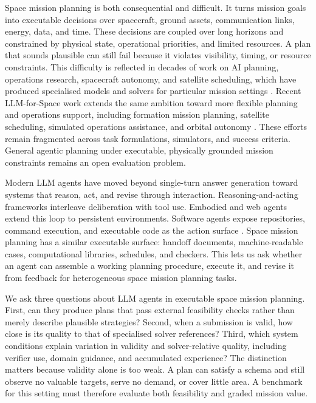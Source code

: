 \documentclass[11pt]{article}
\begin{document}
Space mission planning is both consequential and difficult. It turns mission goals into executable decisions over spacecraft, ground assets, communication links, energy, data, and time. These decisions are coupled over long horizons and constrained by physical state, operational priorities, and limited resources. A plan that sounds plausible can still fail because it violates visibility, timing, or resource constraints. This difficulty is reflected in decades of work on AI planning, operations research, spacecraft autonomy, and satellite scheduling, which have produced specialised models and solvers for particular mission settings \citep{johnston2006automating,lemaitrea2002selecting,he2018improved,lee2024satellite}. Recent LLM-for-Space work extends the same ambition toward more flexible planning and operations support, including formation mission planning, satellite scheduling, simulated operations assistance, and orbital autonomy \citep{zhang2025large,chen2025large,campanelli_2025_llm_satellite_ops,mousist_2025_astrea}. These efforts remain fragmented across task formulations, simulators, and success criteria. General agentic planning under executable, physically grounded mission constraints remains an open evaluation problem.

Modern LLM agents have moved beyond single-turn answer generation toward systems that reason, act, and revise through interaction. Reasoning-and-acting frameworks interleave deliberation with tool use. Embodied and web agents extend this loop to persistent environments. Software agents expose repositories, command execution, and executable code as the action surface \citep{yao2022react,wangvoyager,zhouwebarena,yang2024sweagent,wang2024codeact,wang2024openhands}. Space mission planning has a similar executable surface: handoff documents, machine-readable cases, computational libraries, schedules, and checkers. This lets us ask whether an agent can assemble a working planning procedure, execute it, and revise it from feedback for heterogeneous space mission planning tasks.

We ask three questions about LLM agents in executable space mission planning. First, can they produce plans that pass external feasibility checks rather than merely describe plausible strategies? Second, when a submission is valid, how close is its quality to that of specialised solver references? Third, which system conditions explain variation in validity and solver-relative quality, including verifier use, domain guidance, and accumulated experience? The distinction matters because validity alone is too weak. A plan can satisfy a schema and still observe no valuable targets, serve no demand, or cover little area. A benchmark for this setting must therefore evaluate both feasibility and graded mission value.
\end{document}

